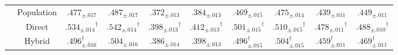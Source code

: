 \begin{tabular}{cc cc cc cc cc}
\addlinespace
\multirow{3}{*}{100} & Population & $.477_{\pm .017}$ & $.487_{\pm .017}$ & $.372_{\pm .013}$ & $.384_{\pm .013}$ & $.469_{\pm .015}$ & $.475_{\pm .014}$ & $.439_{\pm .011}$ & $.449_{\pm .011}$ \\
& Direct & $\bm{.534_{\pm .014}}^{\dagger}$ & $\bm{.542_{\pm .014}}^{\dagger}$ & $\bm{.398_{\pm .013}}^{\dagger}$ & $\bm{.412_{\pm .013}}^{\dagger}$ & $\bm{.501_{\pm .015}}^{\dagger}$ & $\bm{.510_{\pm .015}}^{\dagger}$ & $\bm{.478_{\pm .011}}^{\dagger}$ & $\bm{.488_{\pm .010}}^{\dagger}$ \\
& Hybrid & $.496_{\pm .016}^{\dagger}$ & $.504_{\pm .016}$ & $.386_{\pm .014}$ & $.398_{\pm .013}$ & $.496_{\pm .015}^{\dagger}$ & $.504_{\pm .015}^{\dagger}$ & $.459_{\pm .011}^{\dagger}$ & $.469_{\pm .011}^{\dagger}$ \\
\bottomrule
\end{tabular}

